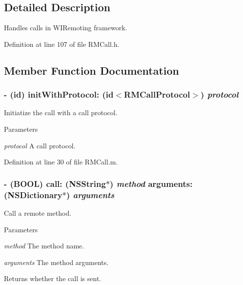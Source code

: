 \subsection{Detailed Description}
Handles calls in WIRemoting framework. 

Definition at line 107 of file RMCall.h.

\subsection{Member Function Documentation}
\hypertarget{interface_r_m_call_a64f1e76758d2d473859064c5b0c6c75d}{
\subsubsection[{initWithProtocol:}]{\setlength{\rightskip}{0pt plus 5cm}-\/ (id) initWithProtocol: (id$<${\bf RMCallProtocol}$>$) {\em protocol}}}
\label{interface_r_m_call_a64f1e76758d2d473859064c5b0c6c75d}


Initiatize the call with a call protocol. 
\begin{DoxyParams}{Parameters}
\item[{\em protocol}]A call protocol. \end{DoxyParams}


Definition at line 30 of file RMCall.m.\hypertarget{interface_r_m_call_a2c8e09fb8f50b66a2ceb3efac2dd9e6b}{
\subsubsection[{call:arguments:}]{\setlength{\rightskip}{0pt plus 5cm}-\/ (BOOL) call: (NSString$\ast$) {\em method}\/ arguments: (NSDictionary$\ast$) {\em arguments}}}
\label{interface_r_m_call_a2c8e09fb8f50b66a2ceb3efac2dd9e6b}


Call a remote method. 
\begin{DoxyParams}{Parameters}
\item[{\em method}]The method name. \item[{\em arguments}]The method arguments.\end{DoxyParams}
\begin{DoxyReturn}{Returns}
whether the call is sent. 
\end{DoxyReturn}


